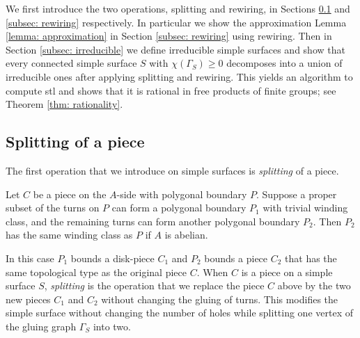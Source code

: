 \documentclass{amsart}
\theoremstyle{definition}
\numberwithin{equation}{section}
\theoremstyle{theorem}
\theoremstyle{remark}
\begin{document}
	We first introduce the two operations, splitting and rewiring, in Sections \ref{subsec: splitting} and \ref{subsec: rewiring} respectively. 
	In particular we show the approximation Lemma \ref{lemma: approximation} in Section \ref{subsec: rewiring} using rewiring.
	Then in Section \ref{subsec: irreducible} we define irreducible simple surfaces and show that every connected simple surface $S$ with $\chi(\Gamma_S)\ge0$ decomposes into a union of irreducible ones after applying splitting and rewiring. This yields an algorithm to compute stl and shows that it is rational in free products of finite groups; see Theorem \ref{thm: rationality}.
	
	\subsection{Splitting of a piece}\label{subsec: splitting}
	The first operation that we introduce on simple surfaces is \emph{splitting} of a piece. 
	
	Let $C$ be a piece on the $A$-side with polygonal boundary $P$. Suppose a proper subset of the turns on $P$ can form a polygonal boundary $P_1$ with trivial winding class, and the remaining turns can form another polygonal boundary $P_2$. Then $P_2$ has the same winding class as $P$ if $A$ is abelian.
	
	In this case $P_1$ bounds a disk-piece $C_1$ and $P_2$ bounds a piece $C_2$ that has the same topological type as the original piece $C$. When $C$ is a piece on a simple surface $S$, \emph{splitting} is the operation that we replace the piece $C$ above by the two new pieces $C_1$ and $C_2$ without changing the gluing of turns. This modifies the simple surface without changing the number of holes while splitting one vertex of the gluing graph $\Gamma_S$ into two.
	
\end{document}
